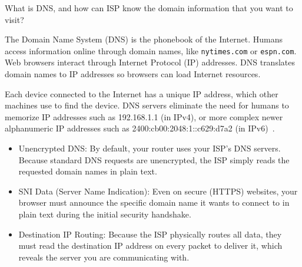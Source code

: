 \item[\textbf{Problem 12}]
What is DNS, and how can ISP know the domain information that you want to visit?

\Solution

The Domain Name System (DNS) is the phonebook of the Internet. Humans access
information online through domain names, like \texttt{nytimes.com} or
\texttt{espn.com}. Web browsers interact through Internet Protocol (IP)
addresses. DNS translates domain names to IP addresses so browsers can load
Internet resources.

Each device connected to the Internet has a unique IP address, which other
machines use to find the device. DNS servers eliminate the need for humans to
memorize IP addresses such as 192.168.1.1 (in IPv4), or more complex newer
alphanumeric IP addresses such as 2400:cb00:2048:1::c629:d7a2 (in
IPv6)~\cite{cloudflare_dns}.

\begin{itemize}
    \item Unencrypted DNS: By default, your router uses your ISP's DNS servers.
    Because standard DNS requests are unencrypted, the ISP simply reads the
    requested domain names in plain text.

    \item SNI Data (Server Name Indication): Even on secure (HTTPS) websites,
    your browser must announce the specific domain name it wants to connect to
    in plain text during the initial security handshake.

    \item Destination IP Routing: Because the ISP physically routes all data,
    they must read the destination IP address on every packet to deliver it,
    which reveals the server you are communicating with.
\end{itemize}
